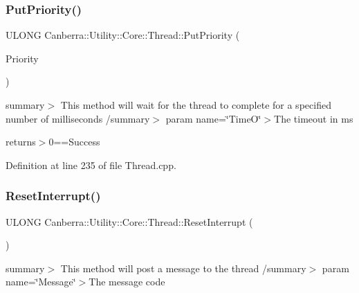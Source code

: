 \mbox{\label{class_canberra_1_1_utility_1_1_core_1_1_thread_a6a7e0f40053cc71f5f99fe789b7ed089_a6a7e0f40053cc71f5f99fe789b7ed089}} 
\subsubsection{\texorpdfstring{Put\+Priority()}{PutPriority()}}
{\footnotesize\ttfamily U\+L\+O\+NG Canberra\+::\+Utility\+::\+Core\+::\+Thread\+::\+Put\+Priority (\begin{DoxyParamCaption}\item[{L\+O\+NG}]{Priority }\end{DoxyParamCaption})}

summary$>$ This method will wait for the thread to complete for a specified number of milliseconds /summary$>$ param name=\char`\"{}\+Time\+O\char`\"{}$>$The timeout in ms

returns$>$0==Success

Definition at line 235 of file Thread.\+cpp.

\mbox{\label{class_canberra_1_1_utility_1_1_core_1_1_thread_acb4ba595a15cc01aa86b846e1a4afd15_acb4ba595a15cc01aa86b846e1a4afd15}} 
\subsubsection{\texorpdfstring{Reset\+Interrupt()}{ResetInterrupt()}}
{\footnotesize\ttfamily U\+L\+O\+NG Canberra\+::\+Utility\+::\+Core\+::\+Thread\+::\+Reset\+Interrupt (\begin{DoxyParamCaption}{ }\end{DoxyParamCaption})\hspace{0.3cm}{\ttfamily [virtual]}}

summary$>$ This method will post a message to the thread /summary$>$ param name=\char`\"{}\+Message\char`\"{}$>$The message code

